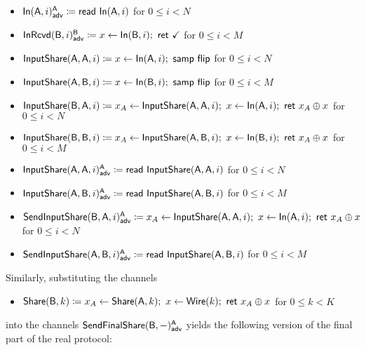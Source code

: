 \begin{itemize}
\item {\color{blue} $\mathsf{In}(\mathsf{A},i)^{\mathsf{A}}_{\mathsf{adv}} \coloneqq \mathsf{read} \ \mathsf{In}(\mathsf{A},i)$ for $0 \leq i < N$}
\item {\color{blue} $\mathsf{InRcvd}(\mathsf{B},i)^{\mathsf{B}}_{\mathsf{adv}} \coloneqq x \leftarrow \mathsf{In}(\mathsf{B},i); \ \mathsf{ret} \ \checkmark$ for $0 \leq i < M$}\smallskip
\item $\mathsf{InputShare}(\mathsf{A},\mathsf{A},i) \coloneqq x \leftarrow \mathsf{In}(\mathsf{A},i); \ \mathsf{samp} \ \mathsf{flip}$ for $0 \leq i < N$
\item $\mathsf{InputShare}(\mathsf{A},\mathsf{B},i) \coloneqq x \leftarrow \mathsf{In}(\mathsf{B},i); \ \mathsf{samp} \ \mathsf{flip}$ for $0 \leq i < M$
\item $\mathsf{InputShare}(\mathsf{B},\mathsf{A},i) \coloneqq x_A \leftarrow \mathsf{InputShare}(\mathsf{A},\mathsf{A},i); \ x \leftarrow \mathsf{In}(\mathsf{A},i); \ \mathsf{ret} \ x_A \oplus x$ for $0 \leq i < N$
\item $\mathsf{InputShare}(\mathsf{B},\mathsf{B},i) \coloneqq x_A \leftarrow \mathsf{InputShare}(\mathsf{A},\mathsf{B},i); \ x \leftarrow \mathsf{In}(\mathsf{B},i); \  \mathsf{ret} \ x_A \oplus x$ for $0 \leq i < M$\smallskip
\item {\color{blue} $\mathsf{InputShare}(\mathsf{A},\mathsf{A},i)^{\mathsf{A}}_{\mathsf{adv}} \coloneqq \mathsf{read} \ \mathsf{InputShare}(\mathsf{A},\mathsf{A},i)$ for $0 \leq i < N$}
\item {\color{blue} $\mathsf{InputShare}(\mathsf{A},\mathsf{B},i)^{\mathsf{A}}_{\mathsf{adv}} \coloneqq \mathsf{read} \ \mathsf{InputShare}(\mathsf{A},\mathsf{B},i)$ for $0 \leq i < M$}\smallskip
\item {\color{red} $\mathsf{SendInputShare}(\mathsf{B},\mathsf{A},i)^{\mathsf{A}}_{\mathsf{adv}} \coloneqq x_A \leftarrow \mathsf{InputShare}(\mathsf{A},\mathsf{A},i); \ x \leftarrow \mathsf{In}(\mathsf{A},i); \ \mathsf{ret} \ x_A \oplus x$ for $0 \leq i < N$}
\item {\color{blue} $\mathsf{SendInputShare}(\mathsf{A},\mathsf{B},i)^{\mathsf{A}}_{\mathsf{adv}} \coloneqq \mathsf{read} \ \mathsf{InputShare}(\mathsf{A},\mathsf{B},i)$ for $0 \leq i < M$}
\end{itemize}

\noindent Similarly, substituting the channels
\begin{itemize}
\item $\mathsf{Share}(\mathsf{B},k) \coloneqq x_A \leftarrow \mathsf{Share}(\mathsf{A},k); \ x \leftarrow \mathsf{Wire}(k); \ \mathsf{ret} \ x_A \oplus x$ for $0 \leq k < K$
\end{itemize}
into the channels $\mathsf{SendFinalShare}(\mathsf{B},-)^{\mathsf{A}}_{\mathsf{adv}}$ yields the following version of the final part of the real protocol:

